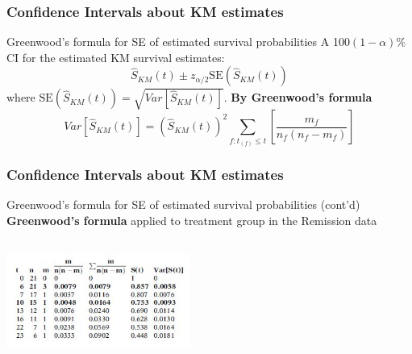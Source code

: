 \documentclass{beamer}
\theoremstyle{definition}
\begin{document}
\begin{frame}
\frametitle{Confidence Intervals about KM estimates}
\begin{block}{Greenwood's formula for SE of estimated survival probabilities}
A 100$(1-\alpha)\%$ CI for the estimated KM survival estimates:
\[
\hat{S}_{KM}(t) \pm z_{\alpha/2}\text{SE}(\hat{S}_{KM}(t))
\]
where $\text{SE}(\hat{S}_{KM}(t)) = \sqrt{Var[\hat{S}_{KM}(t)]}.$
\textbf{By Greenwood's formula}
\[
Var[\hat{S}_{KM}(t)] = (\hat{S}_{KM}(t))^2 \sum_{f:t_{(f)} \le t}\left[\frac{m_f}{n_f(n_f-m_f)}\right]
\]
\end{block}
\end{frame}

\begin{frame}
\frametitle{Confidence Intervals about KM estimates}
\begin{block}{Greenwood's formula for SE of estimated survival probabilities (cont'd)}
\textbf{Greenwood's formula} applied to treatment group in the Remission data
\begin{center}
   \includegraphics[width =6cm, height=4cm]{Ch2_Greenwoods.JPG}
\end{center}
\end{block}
\end{frame}
\end{document}
